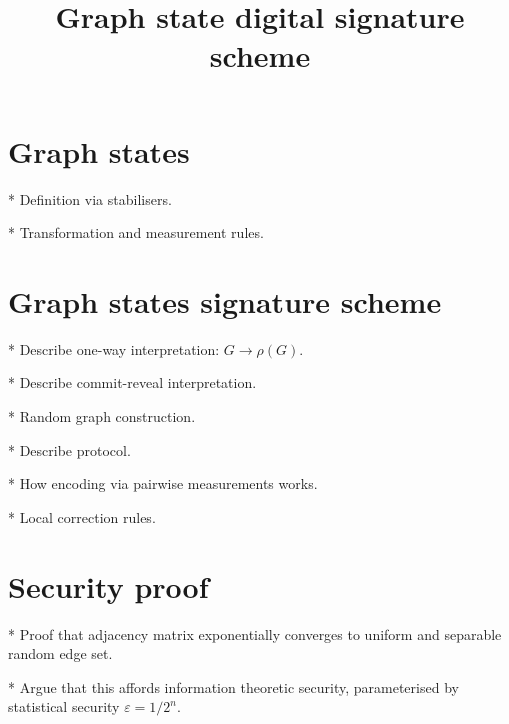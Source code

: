 \documentclass[twocolumn, aps, amsmath, amssymb, nofootinbib, superscriptaddress, longbibliography, doublefloatfix, table-of-contents, eqsecnum, rmp]{revtex4-2}
\begin{document}
\title{Graph state digital signature scheme}

\begin{abstract}
\end{abstract}

\maketitle

\tableofcontents

\section{Graph states}

* Definition via stabilisers.

* Transformation and measurement rules.

\section{Graph states signature scheme}

* Describe one-way interpretation: $G\to\rho(G)$.

* Describe commit-reveal interpretation.

* Random graph construction.

* Describe protocol.

* How encoding via pairwise measurements works.

* Local correction rules.

\section{Security proof}

* Proof that adjacency matrix exponentially converges to uniform and separable random edge set.

* Argue that this affords information theoretic security, parameterised by statistical security $\varepsilon=1/2^n$.
\end{document}
